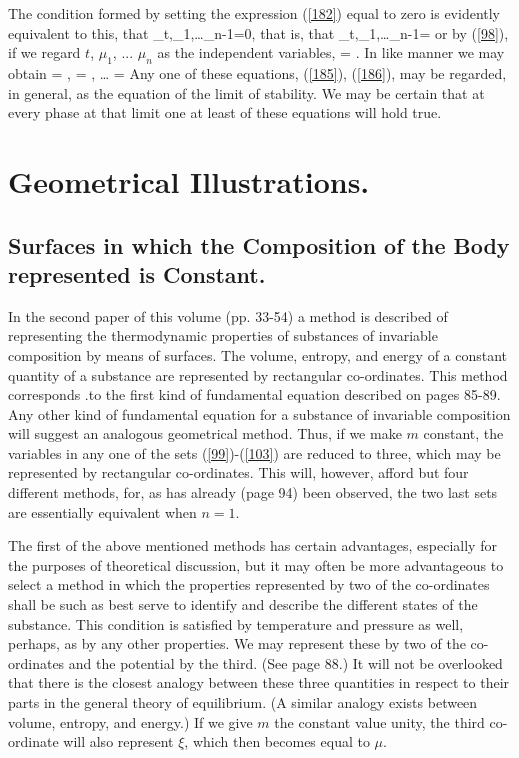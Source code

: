 \documentclass[12pt]{article}
\begin{document}
The condition formed by setting the expression (\ref{182}) equal to zero is evidently equivalent to this, that
\eqs
{}_{t,\mu_1,\dots\mu_{n-1}}=0,\label{183}
\eqe
that is, that
\eqs 
{}_{t,\mu_1,\dots\mu_{n-1}}=\infty \label{184}
\eqe
or by (\ref{98}), if we regard $t$, $\mu_1$, ... $\mu_n$ as the independent variables,
\eqs {} = \infty.   \label{185}\eqe
In like manner we may obtain
\eqs {} = \infty,  = \infty, \dots {} = \infty \label{186}\eqe
Any one of these equations, (\ref{185}), (\ref{186}), may be regarded, in general, as the equation of the limit of stability. We may be certain that at every phase at that limit one at least of these equations will hold true.
\section{Geometrical Illustrations.}
\subsection{Surfaces in which the Composition of the Body represented is Constant.}
In the second paper of this volume (pp. 33-54) a method is described of representing the thermodynamic properties of substances of invariable composition by means of surfaces. The volume, entropy, and energy of a constant quantity of a substance are represented by rectangular co-ordinates.  This method corresponds .to the first kind of fundamental equation described on pages 85-89. Any other kind of fundamental equation for a substance of invariable composition will suggest an analogous geometrical method. Thus, if we make $m$ constant, the variables in any one of the sets (\ref{99})-(\ref{103}) are reduced to three, which may be represented by rectangular co-ordinates. This will, however, afford but four different methods, for, as has already (page 94) been observed, the two last sets are essentially equivalent when $n= 1$.


The first of the above mentioned methods has certain advantages, especially for the purposes of theoretical discussion, but it may often be more advantageous to select a method in which the properties represented by two of the co-ordinates shall be such as best serve to identify and describe the different states of the substance. This condition is satisfied by temperature and pressure as well, perhaps, as by any other properties.  We may represent these by two of the co-ordinates and the potential by the third. (See page 88.) It will not be overlooked that there is the closest analogy between these three quantities in respect to their parts in the general theory of equilibrium. (A similar analogy exists between volume, entropy, and energy.) If we give $m$ the constant value unity, the third co-ordinate will also represent $\xi$, which then becomes equal to $\mu$.
\end{document}
